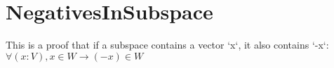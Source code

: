 \section{NegativesInSubspace}

\begin{theorem}
  \label{theorem : subspace_neg}
  \leanok
  This is a proof that if a subspace contains a vector `x`, it also contains `-x`:$ \forall (x : V), x \in W \rightarrow (-x) \in W$
\end{theorem}
